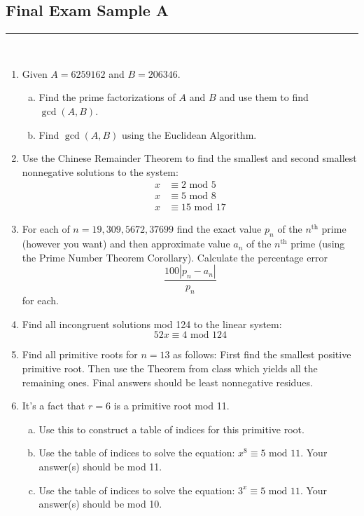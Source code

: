 \documentclass[class=article, crop=false]{standalone}
\begin{document}
\subsection*{Final Exam Sample A}
\rule{\textwidth}{1pt}\\
\begin{enumerate}[1.]
	\item Given $A=6259162$ and $B=206346$.
	\begin{enumerate}[(a)]
		\item Find the prime factorizations of $A$ and $B$ and use them to find $\gcd(A,B)$.
		\item Find $\gcd(A,B)$ using the Euclidean Algorithm.
	\end{enumerate}

	\item Use the Chinese Remainder Theorem to find the smallest and second smallest nonnegative solutions
	to the system:\begin{align*}
		x&\equiv 2\mbox{ mod }5\\
		x&\equiv 5\mbox{ mod }8\\
		x&\equiv 15\mbox{ mod }17
	\end{align*}

	\item For each of $n=19, 309, 5672, 37699$ find the exact value $p_n$ of the $n^{\text{th}}$ prime
	(however you want) and then approximate value $a_n$ of the $n^{\text{th}}$ prime (using the Prime Number Theorem
	Corollary). Calculate the percentage error $$\frac{100 |p_n - a_n|}{p_n}$$ for each.

	\item Find all incongruent solutions mod 124 to the linear system: $$52x\equiv 4\mbox{ mod }124$$
	
	\item Find all primitive roots for $n=13$ as follows: First find the smallest positive primitive root.
	Then use the Theorem from class which yields all the remaining ones. Final answers should be least nonnegative residues.

	\item It's a fact that $r=6$ is a primitive root mod 11.
	\begin{enumerate}[(a)]
		\item Use this to construct a table of indices for this primitive root.
		\item Use the table of indices to solve the equation: $x^8\equiv 5\mbox{ mod }11$. Your answer(s) should be mod 11.
		\item Use the table of indices to solve the equation: $3^x\equiv 5\mbox{ mod }11$. Your answer(s) should be mod 10.
	\end{enumerate}


\end{enumerate}
\end{document}
